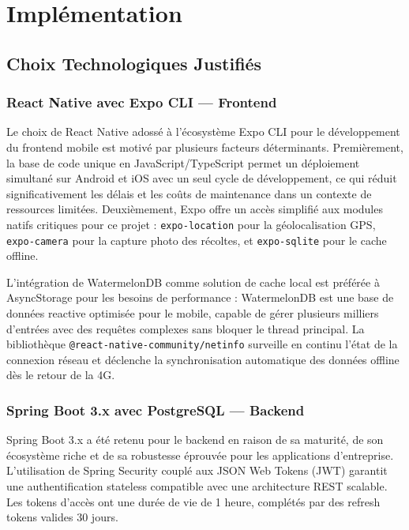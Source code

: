 \documentclass[12pt,a4paper]{report}
\begin{document}
\chapter{Implémentation}

\section{Choix Technologiques Justifiés}

\subsection{React Native avec Expo CLI — Frontend}

Le choix de React Native adossé à l'écosystème Expo CLI pour le développement du frontend mobile est motivé par plusieurs facteurs déterminants. Premièrement, la base de code unique en JavaScript/TypeScript permet un déploiement simultané sur Android et iOS avec un seul cycle de développement, ce qui réduit significativement les délais et les coûts de maintenance dans un contexte de ressources limitées. Deuxièmement, Expo offre un accès simplifié aux modules natifs critiques pour ce projet : \texttt{expo-location} pour la géolocalisation GPS, \texttt{expo-camera} pour la capture photo des récoltes, et \texttt{expo-sqlite} pour le cache offline.

L'intégration de WatermelonDB comme solution de cache local est préférée à AsyncStorage pour les besoins de performance : WatermelonDB est une base de données reactive optimisée pour le mobile, capable de gérer plusieurs milliers d'entrées avec des requêtes complexes sans bloquer le thread principal. La bibliothèque \texttt{@react-native-community/netinfo} surveille en continu l'état de la connexion réseau et déclenche la synchronisation automatique des données offline dès le retour de la 4G.

\subsection{Spring Boot 3.x avec PostgreSQL — Backend}

Spring Boot 3.x a été retenu pour le backend en raison de sa maturité, de son écosystème riche et de sa robustesse éprouvée pour les applications d'entreprise. L'utilisation de Spring Security couplé aux JSON Web Tokens (JWT) garantit une authentification stateless compatible avec une architecture REST scalable. Les tokens d'accès ont une durée de vie de 1 heure, complétés par des refresh tokens valides 30 jours.
\end{document}
